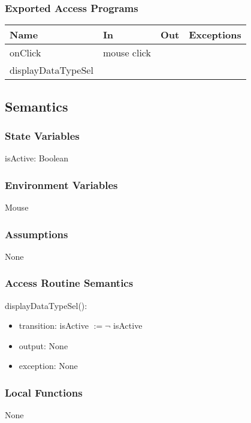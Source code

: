 \documentclass[12pt, titlepage]{article}
\begin{document}
\subsubsection{Exported Access Programs}

\begin{center}
\begin{tabular}{| l | l | l | p{5cm}|}
\hline
\textbf{Name} & \textbf{In} & \textbf{Out} & \textbf{Exceptions} \\
\hline
onClick & mouse click &  &  \\
\hline
displayDataTypeSel &&&\\
\hline
\end{tabular}
\end{center}

\subsection{Semantics}

\subsubsection{State Variables}
isActive: Boolean

\subsubsection{Environment Variables}
Mouse
\subsubsection{Assumptions}
None
\subsubsection{Access Routine Semantics}

\noindent displayDataTypeSel():
\begin{itemize}
\item transition: isActive $\mathit{:= \neg}$ isActive
\item output: None
\item exception: None
\end{itemize}

\subsubsection{Local Functions}
None

\end{document}

